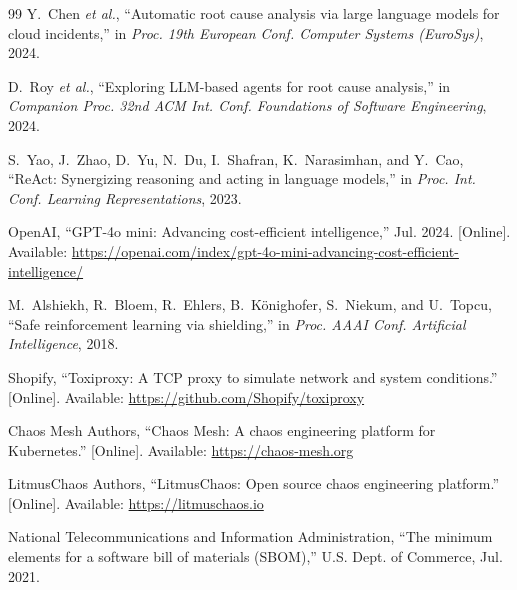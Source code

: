 \begin{thebibliography}{99}
Y.~Chen \emph{et al.}, ``Automatic root cause analysis via large language models for cloud
incidents,'' in \emph{Proc. 19th European Conf. Computer Systems (EuroSys)}, 2024.

D.~Roy \emph{et al.}, ``Exploring LLM-based agents for root cause analysis,'' in \emph{Companion
Proc. 32nd ACM Int. Conf. Foundations of Software Engineering}, 2024.

S.~Yao, J.~Zhao, D.~Yu, N.~Du, I.~Shafran, K.~Narasimhan, and Y.~Cao, ``ReAct: Synergizing reasoning
and acting in language models,'' in \emph{Proc. Int. Conf. Learning Representations}, 2023.

OpenAI, ``GPT-4o mini: Advancing cost-efficient intelligence,'' Jul. 2024. [Online]. Available:
\url{https://openai.com/index/gpt-4o-mini-advancing-cost-efficient-intelligence/}

M.~Alshiekh, R.~Bloem, R.~Ehlers, B.~K{\"o}nighofer, S.~Niekum, and U.~Topcu, ``Safe reinforcement
learning via shielding,'' in \emph{Proc. AAAI Conf. Artificial Intelligence}, 2018.

Shopify, ``Toxiproxy: A TCP proxy to simulate network and system conditions.'' [Online]. Available:
\url{https://github.com/Shopify/toxiproxy}

Chaos Mesh Authors, ``Chaos Mesh: A chaos engineering platform for Kubernetes.'' [Online].
Available: \url{https://chaos-mesh.org}

LitmusChaos Authors, ``LitmusChaos: Open source chaos engineering platform.'' [Online]. Available:
\url{https://litmuschaos.io}

National Telecommunications and Information Administration, ``The minimum elements for a software
bill of materials (SBOM),'' U.S. Dept. of Commerce, Jul. 2021.

\end{thebibliography}
